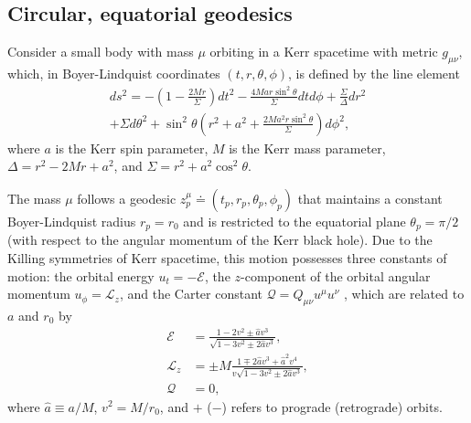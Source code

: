 \documentclass[%
 reprint,
 nofootinbib,
 amsmath,amssymb,
 aps,
 prd,
]{revtex4-2}
\begin{document}
\subsection{Circular, equatorial geodesics}
\label{sec:geo}

Consider a small body with mass $\mu$ orbiting in a Kerr spacetime with metric $g_{\mu\nu}$, which, in Boyer-Lindquist coordinates $(t,r,\theta,\phi)$, is defined by the line element
\begin{multline}
    ds^2 = -\left(1 - \frac{2Mr}{\Sigma} \right) dt^2 - \frac{4Ma r \sin^2\theta}{\Sigma} dtd\phi + \frac{\Sigma}{\Delta} dr^2 
    \\
    + \Sigma d\theta^2 + {\sin^2\theta}\left(r^2+a^2 + \frac{2Ma^2r\sin^2\theta}{\Sigma} \right) d\phi^2,
\end{multline}
where $a$ is the Kerr spin parameter, $M$ is the Kerr mass parameter, $\Delta = r^2 - 2Mr + a^2$, and $\Sigma = r^2+a^2\cos^2\theta$.

The mass $\mu$ follows a geodesic $z_p^\mu \doteq (t_p, r_p, \theta_p, \phi_p)$ that maintains a constant Boyer-Lindquist radius $r_p = r_0$ and is restricted to the equatorial plane $\theta_p = \pi/2$ (with respect to the angular momentum of the Kerr black hole). Due to the Killing symmetries of Kerr spacetime, this motion possesses three constants of motion: the orbital energy $u_t = - \mathcal{E}$, the $z$-component of the orbital angular momentum $u_\phi = \mathcal{L}_z$, and the Carter constant $\mathcal{Q} = Q_{\mu\nu} u^\mu u^\nu$ \cite{SteiWarb20}, which are related to $a$ and $r_0$ by
\begin{subequations} \label{eqn:En}
\begin{align}
    \mathcal{E} &= \frac{1 - 2 v^2 \pm \hat{a} v^3}{\sqrt{1-3v^2\pm 2\hat{a}v^3}},
    \\
    \mathcal{L}_z &= \pm M  \frac{1 \mp 2 \hat{a} v^3 + \hat{a}^2 v^4}{v\sqrt{1-3v^2\pm 2\hat{a}v^3}},
    \\
    \mathcal{Q} &= 0,
\end{align}
\end{subequations}
where $\hat{a} \equiv a/M$, $v^2 = M/r_0$, and $+$ ($-$) refers to prograde (retrograde) orbits.
\end{document}
